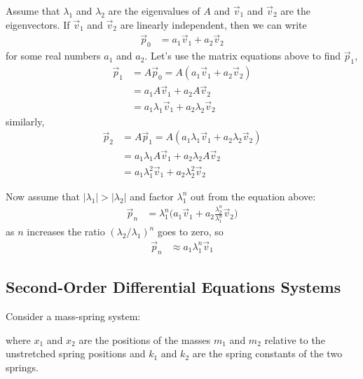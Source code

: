 Assume that $\lambda_1$ and $\lambda_2$ are the eigenvalues of $A$ and $\vec{v}_1$ and $\vec{v}_2$ are the eigenvectors.  If $\vec{v}_1$ and $\vec{v}_2$ are linearly independent, then we can write 
% 
\begin{align*}
 \vec{p}_0 & = a_1 \vec{v}_1 + a_2 \vec{v}_2 
\end{align*}
for some real numbers $a_1$ and $a_2$.  Let's use the matrix equations above to find $\vec{p}_1$, 
% 
\begin{align*}
 \vec{p}_1 & = A \vec{p}_0 = A (a_1 \vec{v}_1 + a_2 \vec{v}_2)  \\
 & = a_1 A \vec{v}_1 + a_2 A \vec{v}_2 \\
 & = a_1 \lambda_1 \vec{v}_1 + a_2 \lambda_2 \vec{v}_2 
\end{align*}
similarly, 
% 
\begin{align*}
\vec{p}_2 & = A \vec{p}_1 = A(a_1 \lambda_1 \vec{v}_1 + a_2 \lambda_2 \vec{v}_2) \\
&= a_1 \lambda_1 A \vec{v}_1 + a_2 \lambda_2 A \vec{v}_2 \\
& = a_1 \lambda_1^2 \vec{v}_1 + a_2 \lambda_2^2 \vec{v}_2  
\end{align*}

Now assume that $|\lambda_1|>|\lambda_2|$ and factor $\lambda_1^n$ out from the equation above:
% 
\begin{align*}
 \vec{p}_n & = \lambda_1^n \biggl( a_1  \vec{v}_1 + a_2 \frac{\lambda_2^n}{\lambda_1^n}  \vec{v}_2 \biggr)  
\end{align*}
as $n$ increases the ratio $(\lambda_2/\lambda_1)^n$ goes to zero, so
% 
\begin{align*}
 \vec{p}_n & \approx a_1 \lambda_1^n \vec{v}_1  
\end{align*}

\subsection{Second-Order Differential Equations Systems}

Consider a mass-spring system:

\begin{center}
\end{center}
where $x_1$ and $x_2$ are the positions of the masses $m_1$ and $m_2$ relative to the unstretched spring positions and $k_1$ and $k_2$ are the spring constants of the two springs. 

